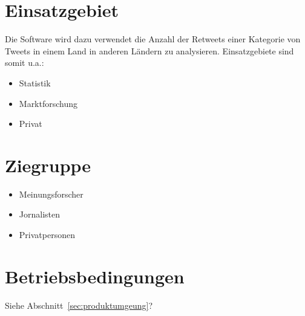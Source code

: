 \section{Einsatzgebiet}
Die Software wird dazu verwendet die Anzahl der Retweets einer Kategorie von Tweets in einem Land in anderen Ländern zu analysieren. Einsatzgebiete sind somit u.a.:
\begin{itemize}
	\item Statistik
	\item Marktforschung
	\item Privat
\end{itemize}
\section{Ziegruppe}
\begin{itemize}
	\item Meinungsforscher
	\item Jornalisten
	\item Privatpersonen
\end{itemize}
\section{Betriebsbedingungen}
Siehe  Abschnitt~\ref{sec:produktumgeung}?
